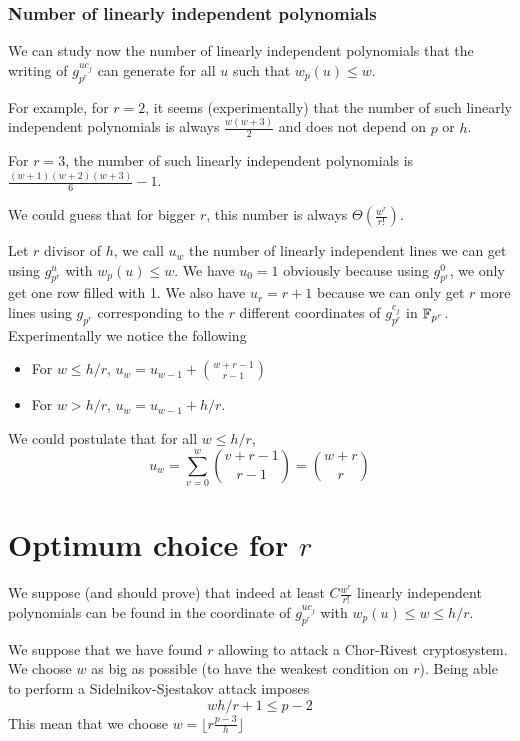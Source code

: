 \documentclass[12pt,a4paper,titlepage]{article}
\begin{document}
\subsubsection{Number of linearly independent polynomials}

We can study now the number of linearly independent polynomials that the writing of $g_{p^r}^{uc_j}$ can generate for all $u$ such that $w_p(u) \leq w$.

For example, for $r = 2$, it seems (experimentally) that the number of such linearly independent polynomials is always $\frac{w(w+3)}{2}$ and does not depend on $p$ or $h$.

For $r = 3$, the number of such linearly independent polynomials is $\frac{(w+1)(w+2)(w+3)}{6}-1$.

We could guess that for bigger $r$, this number is always $\Theta\left(\frac{w^r}{r!}\right)$.

Let $r$ divisor of $h$, we call $u_w$ the number of linearly independent lines we can get using $g_{p^r}^u$ with $w_p(u) \leq w$. We have $u_0 = 1$ obviously because using $g_{p^r}^0$, we only get one row filled with 1.
We also have $u_r = r+1$ because we can only get $r$ more lines using $g_{p^r}$ corresponding to the $r$ different coordinates of $g_{p^r}^{c_j}$ in $\mathbb{F}_{p^r}$.
Experimentally we notice the following
\begin{itemize}
\item For $w \leq h/r$, $u_w = u_{w-1} + \binom{w+r-1}{r-1}$
\item For $w > h/r$, $u_w = u_{w-1} + h/r$.
\end{itemize}

We could postulate that for all $w \leq h/r$,
$$ u_w = \sum_{v=0}^{w} \binom{v+r-1}{r-1} = \binom{w+r}{r} $$

\section{Optimum choice for $r$}

We suppose (and should prove) that indeed at least $C\frac{w^r}{r!}$ linearly independent polynomials can be found in the coordinate of $g_{p^r}^{uc_j}$ with $w_p(u) \leq w \leq h/r$.

We suppose that we have found $r$ allowing to attack a Chor-Rivest cryptosystem. We choose $w$ as big as possible (to have the weakest condition on $r$).
Being able to perform a Sidelnikov-Sjestakov attack imposes
$$ wh/r+1 \leq p-2$$
This mean that we choose $w = \lfloor r \frac{p-3}{h} \rfloor $
\end{document}
